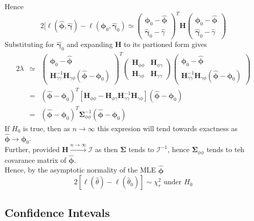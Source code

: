 \documentclass[11pt,a4paper]{article}
\begin{document}
Hence
$$2[\ell(\hat{\pmb\phi},\hat{\pmb\gamma})-\ell(\pmb\phi_0,\hat{\pmb\gamma}_0)\simeq\begin{pmatrix}\pmb\phi_0-\hat{\pmb\phi}\\\hat{\pmb\gamma}_0-\hat\gamma\end{pmatrix}^T\textbf{H}\begin{pmatrix}\pmb\phi_0-\hat{\pmb\phi}\\\hat{\pmb\gamma}_0-\hat\gamma\end{pmatrix}$$
Substituting for $\hat{\pmb\gamma}_0$ and expanding $\textbf{H}$ to its partioned form gives
\[\begin{array}{rcl}
2\lambda&\simeq&\begin{pmatrix}\pmb\phi_0-\hat{\pmb\phi}\\\textbf{H}^{-1}_{\gamma\gamma}\textbf{H}_{\gamma\phi}(\hat{\pmb\phi}-\pmb\phi_0)\end{pmatrix}^T\begin{pmatrix}\textbf{H}_{\phi\phi}&\textbf{H}_{\phi\gamma}\\\textbf{H}_{\gamma\phi}&\textbf{H}_{\gamma\gamma}\end{pmatrix}\begin{pmatrix}\pmb\phi_0-\hat{\pmb\phi}\\\textbf{H}^{-1}_{\gamma\gamma}\textbf{H}_{\gamma\phi}(\hat{\pmb\phi}-\pmb\phi_0)\end{pmatrix}\\
&=&(\hat{\pmb\phi}-\pmb\phi_0)^T[\textbf{H}_{\phi\phi}-\textbf{H}_{\phi\gamma}\textbf{H}^{-1}_{\gamma\gamma}\textbf{H}_{\gamma\phi}](\hat{\pmb\phi}-\pmb\phi_0)\\
&=&(\hat{\pmb\phi}-\pmb\phi_0)^T\pmb\Sigma_{\phi\phi}^{-1}(\hat{\pmb\phi}-\pmb\phi_0)
\end{array}\]
If $H_0$ is true, then as $n\to\infty$ this expresion will tend towards exactness as $\hat{\pmb\phi}\to\pmb\phi_0$.\\
Further, provided $\textbf{H}\overset{n\to\infty}{\longrightarrow}\pmb{\mathcal{I}}$ as then $\pmb\Sigma$ tends to $\pmb{\mathcal{I}}^{-1}$, hence $\pmb\Sigma_{\phi\phi}$ tends to teh covarance matrix of $\hat{\pmb\phi}$.\\
Hence, by the asymptotic normality of the MLE $\hat{\pmb\phi}$
$$2[\ell(\hat\theta)-\ell(\hat\theta_0)]\sim\chi^2_r\text{ under }H_0$$

\subsection{Confidence Intevals}
\end{document}
